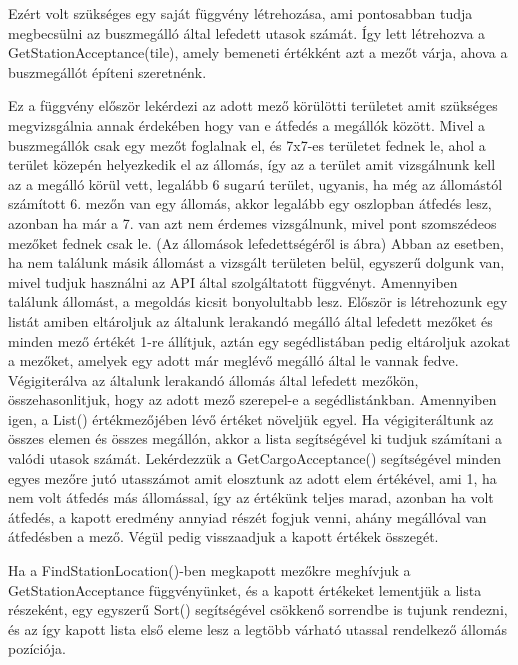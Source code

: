 Ezért volt szükséges egy saját függvény létrehozása, ami pontosabban tudja megbecsülni az buszmegálló által lefedett utasok számát. Így lett létrehozva a GetStationAcceptance(tile), amely bemeneti értékként azt a mezőt várja, ahova a buszmegállót építeni szeretnénk.

Ez a függvény először lekérdezi az adott mező körülötti területet amit szükséges megvizsgálnia annak érdekében hogy van e átfedés a megállók között. Mivel a buszmegállók csak egy mezőt foglalnak el, és 7x7-es területet fednek le, ahol a terület közepén helyezkedik el az állomás, így az a terület amit vizsgálnunk kell az a megálló körül vett, legalább 6 sugarú terület, ugyanis, ha még az állomástól számított 6. mezőn van egy állomás, akkor legalább egy oszlopban átfedés lesz, azonban ha már a 7. van azt nem érdemes vizsgálnunk, mivel pont szomszédeos mezőket fednek csak le. (Az állomások lefedettségéről is ábra) Abban az esetben, ha nem találunk másik állomást a vizsgált területen belül, egyszerű dolgunk van, mivel tudjuk használni az API által szolgáltatott függvényt. Amennyiben találunk állomást, a megoldás kicsit bonyolultabb lesz. Először is létrehozunk egy listát amiben eltároljuk az általunk lerakandó megálló által lefedett mezőket és minden mező értékét 1-re állítjuk, aztán egy segédlistában pedig eltároljuk azokat a mezőket, amelyek egy adott már meglévő megálló által le vannak fedve. Végigiterálva az általunk lerakandó állomás által lefedett mezőkön, összehasonlitjuk, hogy az adott mező szerepel-e a segédlistánkban. Amennyiben igen, a List() értékmezőjében lévő értéket növeljük egyel. Ha végigiteráltunk az összes elemen és összes megállón, akkor a lista segítségével ki tudjuk számítani a valódi utasok számát. Lekérdezzük a GetCargoAcceptance() segítségével minden egyes mezőre jutó utasszámot amit elosztunk az adott elem értékével, ami 1, ha nem volt átfedés más állomással, így az értékünk teljes marad, azonban ha volt átfedés, a kapott eredmény annyiad részét fogjuk venni, ahány megállóval van átfedésben a mező. Végül pedig visszaadjuk a kapott értékek összegét.

Ha a FindStationLocation()-ben megkapott mezőkre meghívjuk a GetStationAcceptance függvényünket, és a kapott értékeket lementjük a lista részeként, egy egyszerű Sort() segítségével csökkenő sorrendbe is tujunk rendezni, és az így kapott lista első eleme lesz a legtöbb várható utassal rendelkező állomás pozíciója.

